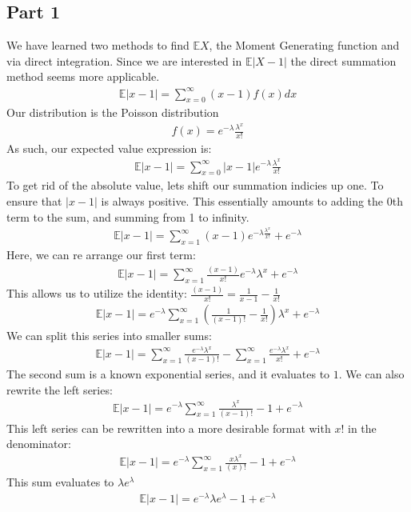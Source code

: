 \documentclass{article}
\begin{document}
\subsection*{Part 1}
We have learned two methods to find $\mathbb{E}X$, the Moment Generating function and via direct integration. Since we are interested in $\mathbb{E}|X-1|$ the direct summation method seems more applicable.
\begin{align*}
\mathbb{E}|x-1|=\sum_{x=0}^{\infty} (x-1) f(x) dx
\end{align*}
Our distribution is the Poisson distribution
\begin{align*}
f(x) = e^{-\lambda} \frac{\lambda^x}{x!}
\end{align*}
As such, our expected value expression is:
\begin{align*}
\mathbb{E}|x-1| = \sum_{x=0}^{\infty} |x-1| e^{-\lambda} \frac{\lambda^x}{x!}
\end{align*}
To get rid of the absolute value, lets shift our summation indicies up one. To ensure that $|x-1|$ is always positive. This essentially amounts to adding the 0th term to the sum, and summing from 1 to infinity.
\begin{align*}
\mathbb{E}|x-1| = \sum_{x=1}^{\infty} (x-1) e^{-\lambda \frac{\lambda^x}{x!}} + e^{-\lambda}
\end{align*}
Here, we can re arrange our first term:
\begin{align*}
\mathbb{E}|x-1| = \sum_{x=1}^{\infty} \frac{(x-1)}{x!} e^{-\lambda} \lambda^x + e^{-\lambda}
\end{align*}
This allows us to utilize the identity: $\frac{(x-1)}{x!} = \frac{1}{x-1} - \frac{1}{x!}$
\begin{align*}
\mathbb{E}|x-1| = e^{-\lambda} \sum_{x=1}^{\infty} (\frac{1}{(x-1)!} - \frac{1}{x!}) \lambda^x + e^{-\lambda}
\end{align*}
We can split this series into smaller sums:
\begin{align*}
\mathbb{E}|x-1| =  \sum_{x=1}^{\infty} \frac{e^{-\lambda} \lambda^x}{(x-1)!} - \sum_{x=1}^{\infty} \frac{ e^{-\lambda} \lambda^x}{x!}  + e^{-\lambda}
\end{align*}
The second sum is a known exponential series, and it evaluates to $1$. We can also rewrite the left series:
\begin{align*}
\mathbb{E}|x-1| = e^{-\lambda} \sum_{x=1}^{\infty} \frac{\lambda^x}{(x-1)!} - 1  + e^{-\lambda}
\end{align*}
This left series can be rewritten into a more desirable format with $x!$ in the denominator:
\begin{align*}
\mathbb{E}|x-1| = e^{-\lambda} \sum_{x=1}^{\infty} \frac{x \lambda^x}{(x)!} - 1  + e^{-\lambda}
\end{align*}
This sum evaluates to $\lambda e^\lambda$
\begin{align*}
\mathbb{E}|x-1| = e^{-\lambda} \lambda e^\lambda - 1  + e^{-\lambda}
\end{align*}
\end{document}

